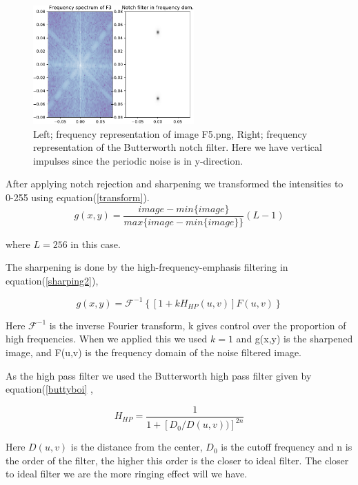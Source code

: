 {    \begin{figure}[!htb]
        {\centering
            \includegraphics[width=0.55\textwidth]{C7F3freq.pdf}
            \caption{Left; frequency representation of image F5.png, Right; frequency representation of the Butterworth notch filter. Here we have vertical impulses since the periodic noise is in y-direction.}
            \label{C7F3freq}
        \par}
        \end{figure}

    After applying notch rejection and sharpening we transformed the intensities to 0-255 using equation(\ref{transform}).
\begin{equation}
    g(x,y) = \frac{image-min\{image\}}{max\{image-min\{image\}\}}(L-1)
    \label{transform}
\end{equation}

where $L = 256$ in this case.

The sharpening is done by the high-frequency-emphasis filtering in equation(\ref{sharping2}),

\begin{equation}
    g(x,y) = \mathcal{F}^{-1}\left\lbrace[1 + kH_{HP}(u,v)]F(u,v) \right\rbrace
    \label{sharping2}
\end{equation}

Here $\mathcal{F}^{-1}$ is the inverse Fourier transform, k gives control over the proportion of high frequencies. When we applied this we used $k = 1$ and g(x,y) is the sharpened image, and F(u,v) is the frequency domain of the noise filtered image.


As the high pass filter we used the Butterworth high pass filter given by equation(\ref{buttyboi} ,

\begin{equation}
   H_{HP} = \frac{1}{1+[D_{0}/D(u,v))]^{2n}}
    \label{buttyboi}
\end{equation}

Here $D(u,v)$ is the distance from the center, $D_{0}$ is the cutoff frequency and n is the order of the filter, the higher this order is the closer to ideal filter. The closer to ideal filter we are the more ringing effect will we have.

}
